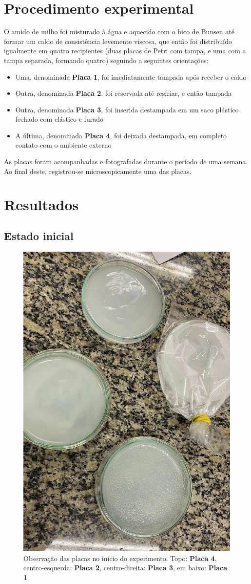 \documentclass[12pt, titlepage]{article}
\begin{document}
\section{Procedimento experimental}
O amido de milho foi misturado à água e aquecido com o bico de Bunsen até formar um caldo de consistência levemente viscosa, que então foi distribuído igualmente em quatro recipientes (duas placas de Petri com tampa, e uma com a tampa separada, formando quatro) seguindo a seguintes orientações:
\begin{itemize}
	\item Uma, denominada \textbf{Placa 1}, foi imediatamente tampada após receber o caldo
	\item Outra, denominada \textbf{Placa 2}, foi reservada até resfriar, e então tampada
	\item Outra, denominada \textbf{Placa 3}, foi inserida destampada em um saco plástico fechado com elástico e furado
	\item A última, denominada \textbf{Placa 4}, foi deixada destampada, em completo contato com o ambiente externo
\end{itemize}
As placas foram acompanhadas e fotografadas durante o período de uma semana. Ao final deste, registrou-se microscopicamente uma das placas.

\section{Resultados}

\subsection{Estado inicial}
\begin{figure}[H]
	\centering
	\includegraphics[width=0.5\linewidth]{img/p1234_inicial.jpeg}
	\caption{Observação das placas no início do experimento. Topo: \textbf{Placa 4}, centro-esquerda: \textbf{Placa 2}, centro-direita: \textbf{Placa 3}, em baixo: \textbf{Placa 1}}
	\label{p1234_inicial}
\end{figure}
\end{document}
